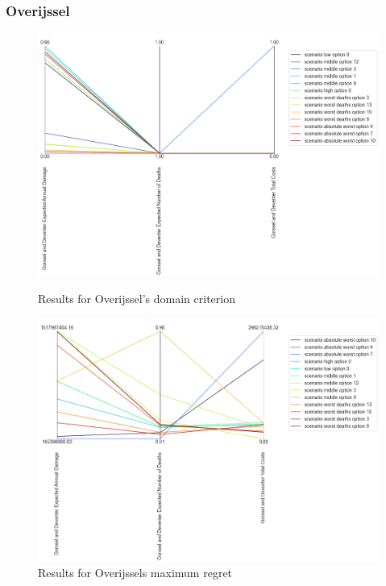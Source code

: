 \subsubsection{Overijssel}

\begin{figure}[H]
  \centering
  \begin{minipage}[b]{0.4\textwidth}
    \includegraphics[width=1.15\textwidth]{report/figures/results/domain_criterion_Overijssel.png}
    \caption{Results for Overijssel's domain criterion}
    \label{fig:domain_criterion_Overijssels}
  \end{minipage}
  \hfill
  \begin{minipage}[b]{0.4\textwidth}
    \includegraphics[width=1.15\textwidth]{report/figures/results/regret_figure_Overijssel.png}
    \caption{Results for Overijssels maximum regret}
    \label{fig:regret_Overijssels}
  \end{minipage}
\end{figure}

